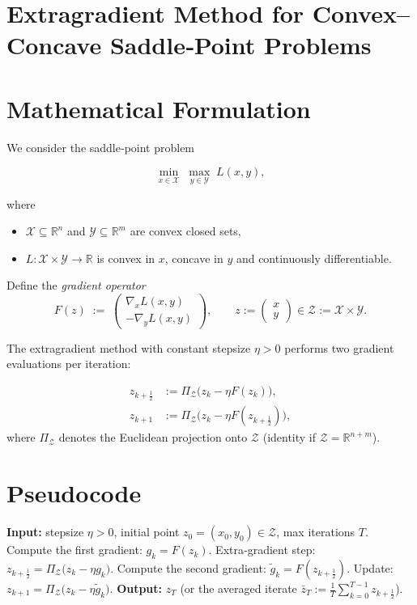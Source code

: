 \documentclass{article}
\begin{document}
\section*{Extragradient Method for Convex--Concave Saddle‑Point Problems}

\section*{Mathematical Formulation}
We consider the saddle‑point problem  

\[
\min_{x\in\mathcal X}\;\max_{y\in\mathcal Y}\;L(x,y),
\]

where  

\begin{itemize}
  \item $\mathcal X\subseteq\mathbb R^{n}$ and $\mathcal Y\subseteq\mathbb R^{m}$ are convex closed sets,
  \item $L:\mathcal X\times\mathcal Y\to\mathbb R$ is convex in $x$, concave in $y$ and continuously differentiable.
\end{itemize}

Define the \emph{gradient operator}
\[
F(z)\;:=\;
\begin{pmatrix}
\nabla_{x}L(x,y)\\[2mm]
-\nabla_{y}L(x,y)
\end{pmatrix},
\qquad 
z:=\begin{pmatrix}x\\ y\end{pmatrix}\in\mathcal Z:=\mathcal X\times\mathcal Y .
\]

The extragradient method with constant stepsize $\eta>0$ performs two gradient evaluations per iteration:

\[
\boxed{
\begin{aligned}
z_{k+\frac12}&:=\Pi_{\mathcal Z}\!\bigl(z_{k}-\eta F(z_{k})\bigr),\tag{1}\\[2mm]
z_{k+1}&:=\Pi_{\mathcal Z}\!\bigl(z_{k}-\eta F(z_{k+\frac12})\bigr),\tag{2}
\end{aligned}}
\]
where $\Pi_{\mathcal Z}$ denotes the Euclidean projection onto $\mathcal Z$ (identity if $\mathcal Z=\mathbb R^{n+m}$).

\section*{Pseudocode}
\begin{algorithm}[H]
\caption{Extragradient Method}
\begin{algorithmic}[1]
\STATE \textbf{Input:} stepsize $\eta>0$, initial point $z_{0}=(x_{0},y_{0})\in\mathcal Z$, max iterations $T$.
    \STATE Compute the first gradient: $g_{k}=F(z_{k})$.
    \STATE Extra‑gradient step: $z_{k+\frac12}= \Pi_{\mathcal Z}\!\bigl(z_{k}-\eta g_{k}\bigr)$.
    \STATE Compute the second gradient: $\tilde g_{k}=F(z_{k+\frac12})$.
    \STATE Update: $z_{k+1}= \Pi_{\mathcal Z}\!\bigl(z_{k}-\eta \tilde g_{k}\bigr)$.
\ENDFOR
\STATE \textbf{Output:} $z_{T}$ (or the averaged iterate $\bar z_{T}:=\frac1T\sum_{k=0}^{T-1}z_{k+\frac12}$).
\end{algorithmic}
\end{algorithm}
\end{document}
